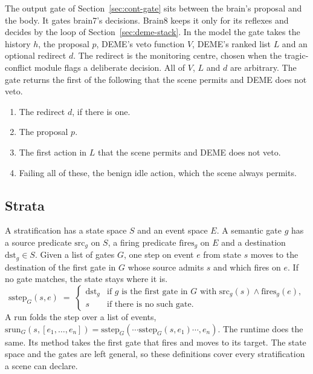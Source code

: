 The output gate of Section~\ref{sec:cont-gate} sits between the brain's proposal and the body.
It gates brain7's decisions.
Brain8 keeps it only for its reflexes and decides by the loop of Section~\ref{sec:deme-stack}.
In the model the gate takes the history $h$, the proposal $p$, DEME's veto function $V$,
DEME's ranked list $L$ and an optional redirect $d$.
The redirect is the monitoring centre, chosen when the tragic-conflict module flags a deliberate
decision.
All of $V$, $L$ and $d$ are arbitrary.
The gate returns the first of the following that the scene permits and DEME does not veto.
\begin{enumerate}
  \item The redirect $d$, if there is one.
  \item The proposal $p$.
  \item The first action in $L$ that the scene permits and DEME does not veto.
  \item Failing all of these, the benign idle action, which the scene always permits.
\end{enumerate}

\subsection{Strata}

A stratification has a state space $S$ and an event space $E$.
A semantic gate $g$ has a source predicate $\mathrm{src}_g$ on $S$, a firing predicate
$\mathrm{fires}_g$ on $E$ and a destination $\mathrm{dst}_g \in S$.
Given a list of gates $G$, one step on event $e$ from state $s$ moves to the destination of the
first gate in $G$ whose source admits $s$ and which fires on $e$.
If no gate matches, the state stays where it is.
\begin{equation}
  \mathrm{sstep}_G(s, e) \;=\;
  \begin{cases}
    \mathrm{dst}_g & \text{if } g \text{ is the first gate in } G \text{ with }
      \mathrm{src}_g(s) \wedge \mathrm{fires}_g(e),\\
    s & \text{if there is no such gate}.
  \end{cases}
\end{equation}
A run folds the step over a list of events,
$\mathrm{srun}_G(s, [e_1, \dots, e_n]) = \mathrm{sstep}_G(\cdots \mathrm{sstep}_G(s, e_1) \cdots, e_n)$.
The runtime does the same.
Its  method takes the first gate that fires and moves to its target.
The state space and the gates are left general, so these definitions cover every stratification
a scene can declare.

